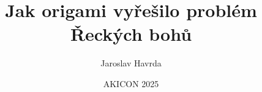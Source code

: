 \documentclass{beamer}
\title{Jak origami vyřešilo problém Řeckých bohů}
\author{Jaroslav Havrda}
\date[AKICon]{AKICON 2025}
\begin{document}
 \begin{frame}
	\titlepage
\end{frame}
\end{document}
